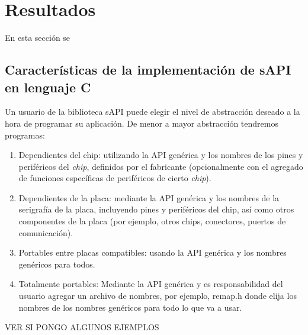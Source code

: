 \section{Resultados}

En esta sección se 

\subsection{Características de la implementación de sAPI en lenguaje C}
\label{sec:codeImplemC}

Un usuario de la biblioteca sAPI puede elegir el nivel de abstracción deseado a la hora de programar su aplicación. De menor a mayor abstracción tendremos programas:

\begin{enumerate}
\item
Dependientes del chip: utilizando la API genérica y los nombres de los pines y periféricos del \emph{chip}, definidos por el fabricante (opcionalmente con el agregado de funciones específicas de periféricos de cierto \emph{chip}).
\item
Dependientes de la placa: mediante la API genérica y los nombres de la serigrafía de la placa, incluyendo pines y periféricos del chip, así como otros componentes de la placa (por ejemplo, otros chips, conectores, puertos de comunicación).
\item
Portables entre placas compatibles: usando la API genérica y los nombres genéricos para todos.
\item
Totalmente portables: Mediante la API genérica y es responsabilidad del usuario agregar un archivo de nombres, por ejemplo, remap.h donde elija los nombres de los nombres genéricos para todo lo que va a usar.
\end{enumerate}

VER SI PONGO ALGUNOS EJEMPLOS

